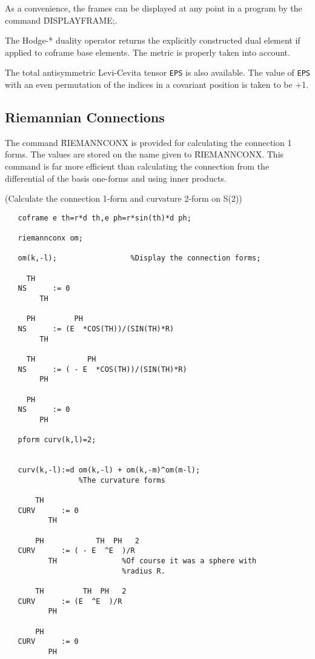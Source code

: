  
\hypertarget{command:DISPLAYFRAME}{}
As a convenience, the frames can be displayed at any point in a program
by the command \f{DISPLAYFRAME;}\label{DISPLAYFRAME}.

The Hodge-* duality operator returns the explicitly constructed dual
element if applied to coframe base elements. The metric is properly
taken into account.

 
The total antisymmetric Levi-Cevita tensor \texttt{EPS}\label{EPS} is
also available.  The value of \texttt{EPS} with an even permutation of the
indices in a covariant position is taken to be +1.


\subsection{Riemannian Connections}

The command \f{RIEMANNCONX} is provided for calculating the
 \label{RIEMANNCONX}
\hypertarget{command:RIEMANNCONX}{}
connection 1 forms.  The values are stored on the name given to
\f{RIEMANNCONX}.  This command is far more efficient than calculating the
connection from the differential of the basis one-forms and using
inner products.

\example (Calculate the connection 1-form and curvature 2-form on S(2))

\begin{verbatim}
   coframe e th=r*d th,e ph=r*sin(th)*d ph;

   riemannconx om;

   om(k,-l);                 %Display the connection forms;

     TH
   NS      := 0
        TH

     PH         PH
   NS      := (E  *COS(TH))/(SIN(TH)*R)
        TH

     TH            PH
   NS      := ( - E  *COS(TH))/(SIN(TH)*R)
        PH

     PH
   NS      := 0
        PH

   pform curv(k,l)=2;


   curv(k,-l):=d om(k,-l) + om(k,-m)^om(m-l);
                 %The curvature forms

       TH
   CURV      := 0
          TH

       PH            TH  PH   2
   CURV      := ( - E  ^E  )/R
          TH               %Of course it was a sphere with
                           %radius R.

       TH         TH  PH   2
   CURV      := (E  ^E  )/R
          PH

       PH
   CURV      := 0
          PH
\end{verbatim}

